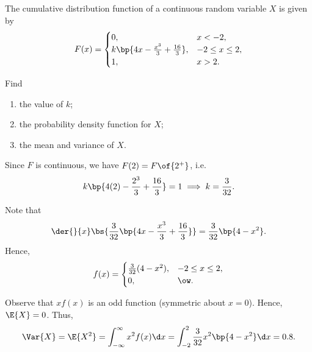\begin{problem}
    The cumulative distribution function of a continuous random variable $X$ is given by \[F(x) = \begin{cases}
        0, & x < -2,\\
        k\bp{4x - \frac{x^3}3 + \frac{16}{3}}, & -2 \leq x \leq 2,\\
        1, & x > 2.
    \end{cases}\]

    Find
    \begin{enumerate}
        \item the value of $k$;
        \item the probability density function for $X$;
        \item the mean and variance of $X$.
    \end{enumerate}
\end{problem}
\begin{solution}
    \begin{ppart}
        Since $F$ is continuous, we have $F(2) = F\of{2^+}$, i.e. \[k \bp{4(2) - \frac{2^3}3 + \frac{16}3} = 1 \implies k = \frac3{32}.\]
    \end{ppart}
    \begin{ppart}
        Note that \[\der{}{x} \bs{\frac3{32}\bp{4x - \frac{x^3}3 + \frac{16}{3}}} = \frac{3}{32} \bp{4 - x^2}.\] Hence, \[f(x) = \begin{cases}
            \frac3{32} (4 - x^2), & -2 \leq x \leq 2,\\
            0, & \ow.
        \end{cases}\]
    \end{ppart}
    \begin{ppart}
        Observe that $x f(x)$ is an odd function (symmetric about $x = 0$). Hence, $\E{X} = 0$. Thus, \[\Var{X} = \E{X^2} = \int_{-\infty}^\infty x^2 f(x) \d x = \int_{-2}^2 \frac3{32} x^2 \bp{4 - x^2} \d x = 0.8.\]
    \end{ppart}
\end{solution}

